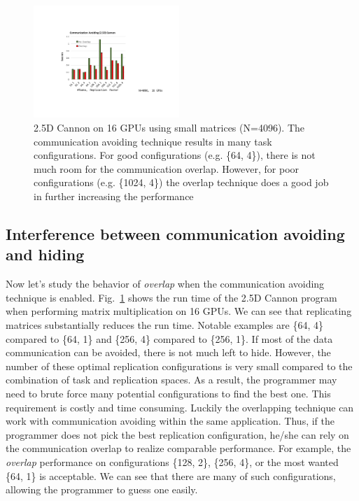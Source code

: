 \begin{figure}[htb]
\centering
\includegraphics[width=0.49\textwidth]{figures/CA_4096.pdf}
\caption{2.5D Cannon on 16 GPUs using small matrices (N=4096). The communication avoiding technique results in many task configurations. For good configurations (e.g. \{64, 4\}), there is not much room for the communication overlap. However, for poor configurations (e.g. \{1024, 4\}) the overlap technique does a good job in further increasing the performance}
\label{CA_4096}
\end{figure}

\subsection{Interference between communication avoiding and hiding}
\label{subsec:CAvsOlap}
Now let's study the behavior of {\em overlap} when the communication avoiding technique is enabled.
Fig.~\ref{CA_4096} shows the run time of the 2.5D Cannon program when performing matrix multiplication on 16 GPUs.
We can see that replicating matrices substantially reduces the run time.
Notable examples are  \{64, 4\} compared to \{64, 1\} and \{256, 4\} compared to \{256, 1\}.
If most of the data communication can be avoided, there is not much left to hide.
However, the number of these optimal replication configurations is very small compared to the combination of task and replication spaces.
As a result, the programmer may need to brute force many potential configurations to find the best one.
This requirement is costly and time consuming.
Luckily the overlapping technique can work with communication avoiding within the same application.
Thus, if the programmer does not pick the best replication configuration, he/she can rely on the communication overlap to realize comparable performance.
For example, the {\em overlap} performance on configurations \{128, 2\}, \{256, 4\}, or the most wanted \{64, 1\} is  acceptable. 
We can see that there are many of such configurations, allowing the programmer to guess one easily.

